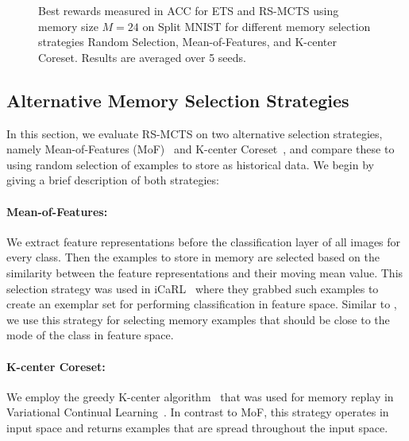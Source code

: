 
\begin{figure*}[h!]
  \centering
  \setlength{\figwidth}{0.32\textwidth}
  \setlength{\figheight}{0.25\textwidth}
  
  \vspace{-6pt}
  \caption{Best rewards measured in ACC for ETS and RS-MCTS using memory size $M=24$ on Split MNIST for different memory selection strategies Random Selection, Mean-of-Features, and K-center Coreset. Results are averaged over 5 seeds. 
  }
  \label{fig:MNIST_mcts_best_rewards_M24_selection_methods_appendix}
\end{figure*}

\subsection{Alternative Memory Selection Strategies}\label{app:alternative_memory_selection_strategies}

In this section, we evaluate RS-MCTS on two alternative selection strategies, namely Mean-of-Features (MoF)~\citep{rebuffi2017icarl} and K-center Coreset~\citep{nguyen2017variational}, and compare these to using random selection of examples to store as historical data. We begin by giving a brief description of both strategies: %

\paragraph{Mean-of-Features:} We extract feature representations before the classification layer of all images for every class. Then the examples to store in memory are selected based on the similarity between the feature representations and their moving mean value. This selection strategy was used in iCaRL~\citep{rebuffi2017icarl} where they grabbed such examples to create an exemplar set for performing classification in feature space. Similar to \citet{chaudhry2019tiny}, we use this strategy for selecting memory examples that should be close to the mode of the class in feature space.%

\paragraph{K-center Coreset:} We employ the greedy K-center algorithm~\citep{gonzalez1985clustering} that was used for memory replay in Variational Continual Learning~\citep{nguyen2017variational}. In contrast to MoF, this strategy operates in input space and returns examples that are spread throughout the input space.%

